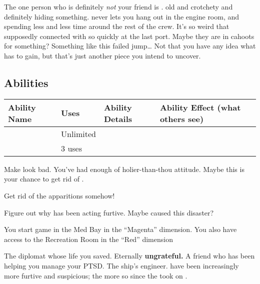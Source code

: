\documentclass[char]{TMFHope}
\begin{document}
The one person who is definitely \emph{not} your friend is \cEng{\full}. \cEng{\They} \cEng{\are} old and crotchety and definitely hiding something. \cEng{} never lets you hang out in the engine room, and \cEng{\they} \cEng{\are} spending less and less time around the rest of the crew. It's so weird that \cEng{\they} supposedly connected with \cBoy{} so quickly at the last port. Maybe they are in cahoots for something? Something like this failed jump\ldots{} Not that you have any idea what \cEng{} has to gain, but that's just another piece you intend to uncover.

\subsection*{Abilities}
\begin{tabular}{|p{3cm}|p{1.5cm}|p{6.5cm}|p{5cm}|} 
 \hline
 \textbf{Ability Name} & \textbf{Uses} & \textbf{Ability Details} & \textbf{Ability Effect (what others see)} \\ 
\hline 
 \aThreat{\MYname} & Unlimited & \aThreat{\MYtext} & \aThreat{\MYeffect} \\ 
\hline
 \aFirstAid{\MYname} & 3 uses & \aFirstAid{\MYtext} & \aFirstAid{\MYeffect}\\ 
 \hline
\end{tabular}

\begin{itemz}[Goals]
	\item Make \cDip{} look bad. You've had enough of \cDip{\their} holier-than-thou attitude. Maybe this is your chance to get rid of \cDip{\them}.
	\item Get rid of the apparitions somehow!
	\item Figure out why \cEng{} has been acting furtive.  Maybe \cEng{\they} caused this disaster?
\end{itemz}

\begin{itemz}[Notes]
	\item You start game in the Med Bay in the ``Magenta'' dimension. You also have access to the Recreation Room in the ``Red'' dimension
\end{itemz}

\begin{contacts}
	\contact{\cDip{}} The diplomat whose life you saved. Eternally \textbf{ungrateful.}
	\contact{\cNav{}} A friend who has been helping you manage your PTSD.
	\contact{\cEng{}} The ship's engineer. \cEng{\They} have been increasingly more furtive and suspicious; the more so since the \pNew{} took on \cBoy{}.
\end{contacts}
\end{document}
